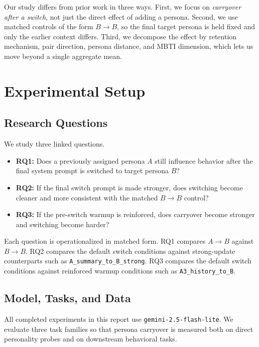 \documentclass[11pt]{article}
\begin{document}
Our study differs from prior work in three ways.
First, we focus on \emph{carryover after a switch}, not just the direct effect of adding a persona.
Second, we use matched controls of the form $B \rightarrow B$, so the final target persona is held fixed and only the earlier context differs.
Third, we decompose the effect by retention mechanism, pair direction, persona distance, and MBTI dimension, which lets us move beyond a single aggregate mean.

\section{Experimental Setup}

\subsection{Research Questions}

We study three linked questions.

\begin{itemize}[leftmargin=*]
    \item \textbf{RQ1:} Does a previously assigned persona $A$ still influence behavior after the final system prompt is switched to target persona $B$?
    \item \textbf{RQ2:} If the final switch prompt is made stronger, does switching become cleaner and more consistent with the matched $B \rightarrow B$ control?
    \item \textbf{RQ3:} If the pre-switch warmup is reinforced, does carryover become stronger and switching become harder?
\end{itemize}

Each question is operationalized in matched form.
RQ1 compares $A \rightarrow B$ against $B \rightarrow B$.
RQ2 compares the default switch conditions against strong-update counterparts such as \texttt{A\_summary\_to\_B\_strong}.
RQ3 compares the default switch conditions against reinforced warmup conditions such as \texttt{A3\_history\_to\_B}.

\subsection{Model, Tasks, and Data}

All completed experiments in this report use \texttt{gemini-2.5-flash-lite}.
We evaluate three task families so that persona carryover is measured both on direct personality probes and on downstream behavioral tasks.
\end{document}
